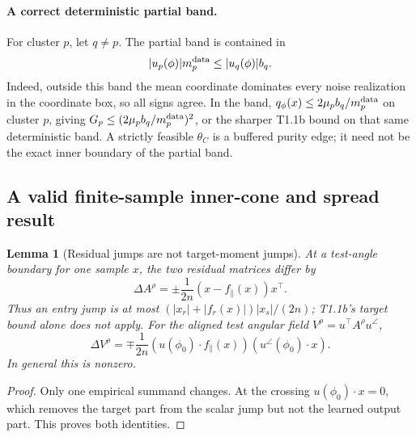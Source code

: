 \documentclass{article} %
\theoremstyle{plain}
\newtheorem{lemma}[theorem]{Lemma}
\theoremstyle{definition}
\theoremstyle{remark}
\begin{document}
\paragraph{A correct deterministic partial band.}
For cluster $p$, let $q\ne p$. The partial band is contained in
\begin{equation}\label{sbnew:partial-band}
 |u_p(\phi)|m_p^{\rm data}\le |u_q(\phi)|b_q.
\end{equation}
Indeed, outside this band the mean coordinate dominates every noise
realization in the coordinate box, so all signs agree. In the band,
$q_\phi(x)\le2\mu_p b_q/m_p^{\rm data}$ on cluster $p$, giving
$G_p\le(2\mu_pb_q/m_p^{\rm data})^2$, or the sharper T1.1b bound on that
same deterministic band. A strictly feasible $\theta_C$ is a buffered
purity edge; it need not be the exact inner boundary of the partial band.

\subsection{A valid finite-sample inner-cone and spread result}
\begin{lemma}[Residual jumps are not target-moment jumps]
\label{sbnew:jumps}
At a test-angle boundary for one sample $x$, the two residual matrices
differ by
\begin{equation}\label{sbnew:residual-jump}
 \Delta A^\rho=\pm\frac1{2n}(x-f_\parallel(x))x^\top.
\end{equation}
Thus an entry jump is at most
$(|x_r|+|f_r(x)|)|x_s|/(2n)$; T1.1b's target bound alone does not apply.
For the aligned test angular field $V^\rho=u^\top A^\rho u^\angle$,
\begin{equation}\label{sbnew:V-jump}
 \Delta V^\rho=\mp\frac1{2n}
 (u(\phi_0)\cdot f_\parallel(x))(u^\angle(\phi_0)\cdot x).
\end{equation}
In general this is nonzero.
\end{lemma}
\begin{proof}
Only one empirical summand changes. At the crossing $u(\phi_0)\cdot x=0$,
which removes the target part from the scalar jump but not the learned
output part. This proves both identities.
\end{proof}
\end{document}
